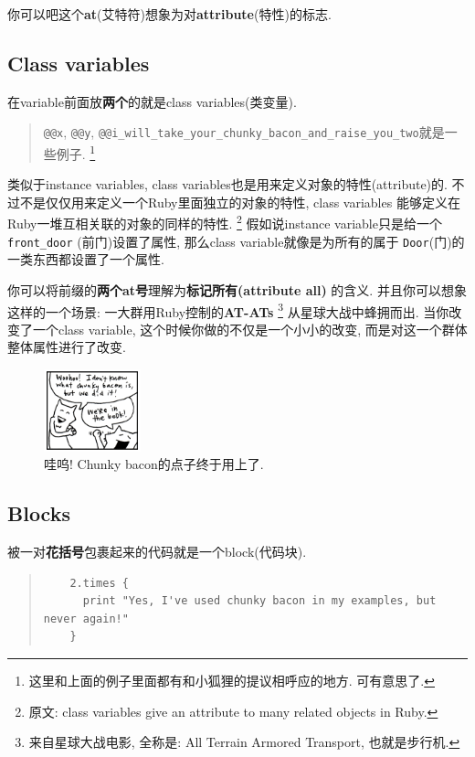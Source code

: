 你可以吧这个\textbf{at}(艾特符)想象为对\textbf{attribute}(特性)的标志. 

\subsection*{Class variables}
在variable前面放\textbf{两个}的就是class variables(类变量). 

\begin{quotation}
  \texttt{@@x}, \texttt{@@y}, \texttt{@@i_will_take_your_chunky_bacon_and_raise_you_two}就是一些例子. 
  \footnote{这里和上面的例子里面都有和小狐狸的提议相呼应的地方. 可有意思了. }
\end{quotation}

类似于instance variables, 
class variables也是用来定义对象的特性(attribute)的. 
不过不是仅仅用来定义一个Ruby里面独立的对象的特性, class variables
能够定义在Ruby一堆互相关联的对象的同样的特性. 
\footnote{原文: class variables give an attribute to many related objects in Ruby.}
假如说instance variable只是给一个\texttt{front_door}
(前门)设置了属性, 那么class variable就像是为所有的属于
\texttt{Door}(门)的一类东西都设置了一个属性. 

你可以将前缀的\textbf{两个at号}理解为\textbf{标记所有(attribute all)}
的含义. 并且你可以想象这样的一个场景: 一大群用Ruby控制的\textbf{AT-ATs}
\footnote{来自星球大战电影, 全称是: All Terrain Armored Transport, 也就是步行机. }
从星球大战中蜂拥而出. 当你改变了一个class variable, 
这个时候你做的不仅是一个小小的改变, 而是对这一个群体整体属性进行了改变. 

\begin{figure}[h]
  \centering
  \includegraphics[width=0.25\textwidth]{image/why/foxes-4f.png}
  \caption{哇呜! Chunky bacon的点子终于用上了. }
\end{figure}

\subsection*{Blocks}
被一对\textbf{花括号}包裹起来的代码就是一个block(代码块). 

\begin{quotation}
  \begin{verbatim}
    2.times {
      print "Yes, I've used chunky bacon in my examples, but never again!"
    }
  \end{verbatim}
\end{quotation}

